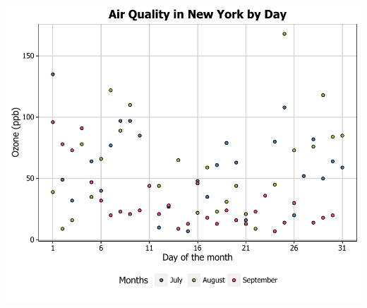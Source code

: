 \documentclass[]{article}
\begin{document}
\begin{center}\includegraphics{5_Scatter_Plots_pdf/scatter_16-1} \end{center}
\end{document}
